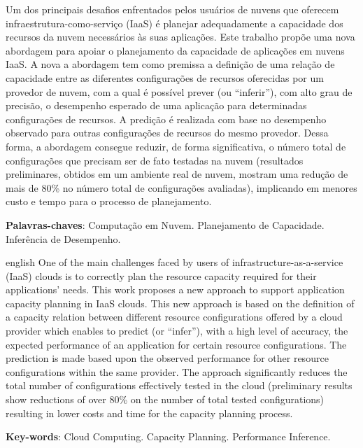 \setlength{\absparsep}{18pt} %
\begin{resumo}
Um dos principais desafios enfrentados pelos usuários de nuvens que oferecem 
infraestrutura-como-serviço (IaaS) é planejar adequadamente a capacidade dos 
recursos da nuvem necessários às suas aplicações. Este trabalho propõe uma nova 
abordagem para apoiar o planejamento da capacidade de aplicações em nuvens IaaS. 
A nova a abordagem tem como premissa a definição de uma relação de capacidade 
entre as diferentes configurações de recursos oferecidas por um provedor de nuvem, 
com a qual é possível prever (ou ``inferir''), com alto grau de precisão, o 
desempenho esperado de uma aplicação para determinadas configurações de recursos. 
A predição é realizada com base no desempenho observado para outras configurações 
de recursos do mesmo provedor. Dessa forma, a abordagem consegue reduzir, de 
forma significativa, o número total de configurações que precisam ser de fato 
testadas na nuvem (resultados preliminares, obtidos em um ambiente real de nuvem, 
mostram uma redução de mais de 80\% no número total de configurações avaliadas), 
implicando em menores custo e tempo para o processo de planejamento.

 \textbf{Palavras-chaves}: Computação em Nuvem. Planejamento de Capacidade. Inferência de Desempenho.
\end{resumo}

\begin{resumo}[Abstract]
 \begin{otherlanguage*}{english}
One of the main challenges faced by users of infrastructure-as-a-service (IaaS) 
clouds is to correctly plan the resource capacity required for their applications'
needs. This work proposes a new approach to support application capacity planning 
in IaaS clouds. This new approach is based on the definition of a capacity relation 
between different resource configurations offered by a cloud provider which enables 
to predict (or ``infer''), with a high level of accuracy, the expected performance 
of an application for certain resource configurations. The prediction is made based
upon the observed performance for other resource configurations within the same 
provider. The approach significantly reduces the total number of configurations 
effectively tested in the cloud (preliminary results show reductions of over 80\% 
on the number of total tested configurations) resulting in lower costs and time 
for the capacity planning process.

   \vspace{\onelineskip}
 
   \noindent 
   \textbf{Key-words}: Cloud Computing. Capacity Planning. Performance Inference.
 \end{otherlanguage*}
\end{resumo}
